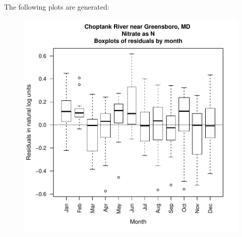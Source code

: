 \documentclass[a4paper,11pt]{article}
\begin{document}
The following plots are generated:
\begin{figure}[htbp]
  \begin{minipage}[h]{0.5\linewidth}
    \begin{center}

\includegraphics{EGRET-figboxResidMonth}
    \label{fig:boxResidMonth}
    \end{center}
  \end{minipage}
  \hspace{0.5cm}
  \begin{minipage}[h]{0.5\linewidth}
    \begin{center}



\end{center}
\end{minipage}
\end{figure}
\end{document}
